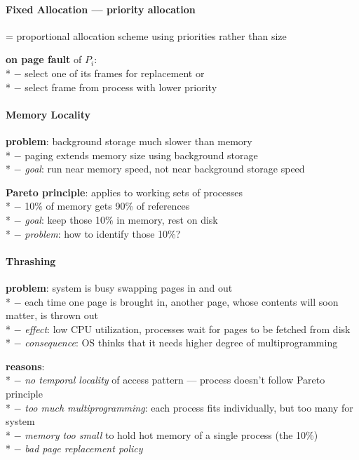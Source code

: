 \paragraph{Fixed Allocation --- priority allocation}
\begin{items}
  \item = proportional allocation scheme using priorities rather than size
  \item \textbf{on page fault} of $ P_i $: \\*
    $ - $ select one of its frames for replacement or \\*
    $ - $ select frame from process with lower priority
\end{items}

\paragraph{Memory Locality}
\begin{items}
  \item \textbf{problem}: background storage much slower than memory \\*
    $ - $ paging extends memory size using background storage \\*
    $ - $ \emph{goal}: run near memory speed, not near background storage speed
  \item \textbf{Pareto principle}: applies to working sets of processes \\*
    $ - $ 10\% of memory gets 90\% of references \\*
    $ - $ \emph{goal}: keep those 10\% in memory, rest on disk \\*
    $ - $ \emph{problem}: how to identify those 10\%?
\end{items}

\paragraph{Thrashing}
\begin{items}
  \item \textbf{problem}: system is busy swapping pages in and out \\*
    $ - $ each time one page is brought in, another page, whose contents will soon matter, is thrown out \\*
    $ - $ \emph{effect}: low CPU utilization, processes wait for pages to be fetched from disk \\*
    $ - $ \emph{consequence}: OS thinks that it needs higher degree of multiprogramming
  \item \textbf{reasons}: \\*
    $ - $ \emph{no temporal locality} of access pattern --- process doesn't follow Pareto principle \\*
    $ - $ \emph{too much multiprogramming}: each process fits individually, but too many for system \\*
    $ - $ \emph{memory too small} to hold hot memory of a single process (the 10\%) \\*
    $ - $ \emph{bad page replacement policy}
\end{items}

